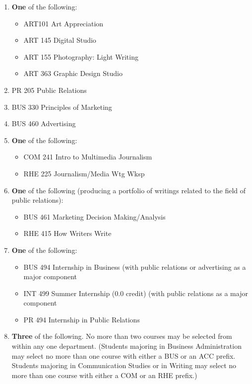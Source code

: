 \documentclass[
  letterpaper,
]{scrbook}
\providecommand{\tightlist}{%
  \setlength{\itemsep}{0pt}\setlength{\parskip}{0pt}}
\begin{document}
\begin{enumerate}
\def\labelenumi{\arabic{enumi}.}
\item
  \textbf{One} of the following:

  \begin{itemize}
  \tightlist
  \item
    ART101 Art Appreciation
  \item
    ART 145 Digital Studio
  \item
    ART 155 Photography: Light Writing
  \item
    ART 363 Graphic Design Studio
  \end{itemize}
\item
  PR 205 Public Relations
\item
  BUS 330 Principles of Marketing
\item
  BUS 460 Advertising
\item
  \textbf{One} of the following:

  \begin{itemize}
  \tightlist
  \item
    COM 241 Intro to Multimedia Journalism
  \item
    RHE 225 Journalism/Media Wtg Wksp
  \end{itemize}
\item
  \textbf{One} of the following (producing a portfolio of writings
  related to the field of public relations):

  \begin{itemize}
  \tightlist
  \item
    BUS 461 Marketing Decision Making/Analysis
  \item
    RHE 415 How Writers Write
  \end{itemize}
\item
  \textbf{One} of the following:

  \begin{itemize}
  \tightlist
  \item
    BUS 494 Internship in Business (with public relations or advertising
    as a major component
  \item
    INT 499 Summer Internship (0.0 credit) (with public relations as a
    major component
  \item
    PR 494 Internship in Public Relations
  \end{itemize}
\item
  \textbf{Three} of the following. No more than two courses may be
  selected from within any one department. (Students majoring in
  Business Administration may select no more than one course with either
  a BUS or an ACC prefix. Students majoring in Communication Studies or
  in Writing may select no more than one course with either a COM or an
  RHE prefix.)


\end{enumerate}
\end{document}
